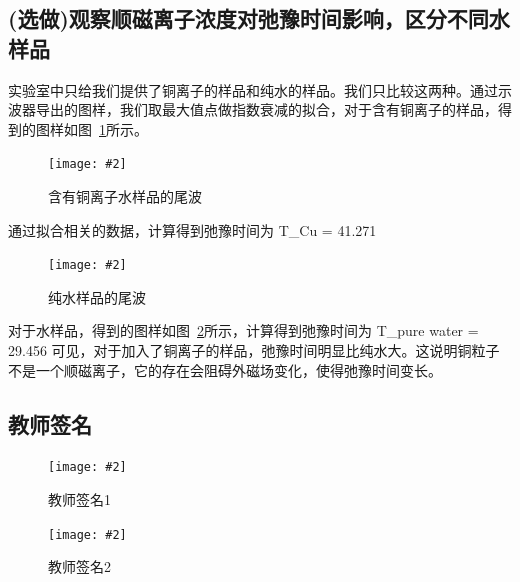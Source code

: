 \documentclass{ctexart}
\newcommand{\cpic}[2]{
\begin{center}
\texttt{[image: \#2]}
\end{center}
}
\newcommand{\cpicn}[3]
{
\begin{figure}[H]
\cpic{#1}{#2}
\caption{#3\label{#2}}
\end{figure}
}
\begin{document}
\subsection{(选做)观察顺磁离子浓度对弛豫时间影响，区分不同水样品}
实验室中只给我们提供了铜离子的样品和纯水的样品。我们只比较这两种。通过示波器导出的图样，我们取最大值点做指数衰减的拟合，对于含有铜离子的样品，得到的图样如图~\ref{cu}所示。
\cpicn{0.5}{cu}{含有铜离子水样品的尾波}
通过拟合相关的数据，计算得到弛豫时间为
\beq
T_{Cu} = 41.271
\eeq
\cpicn{0.5}{water}{纯水样品的尾波}
对于水样品，得到的图样如图~\ref{water}所示，计算得到弛豫时间为
\beq
T_{\rm pure water} = 29.456 
\eeq
可见，对于加入了铜离子的样品，弛豫时间明显比纯水大。这说明铜粒子不是一个顺磁离子，它的存在会阻碍外磁场变化，使得弛豫时间变长。
\subsection{教师签名}
\cpicn{0.2}{sign1}{教师签名1}
\cpicn{0.2}{sign2}{教师签名2}




\end{document}
